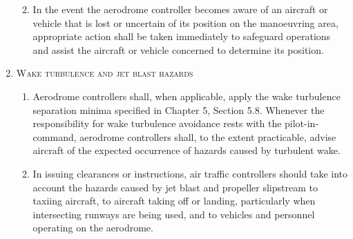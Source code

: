 \documentclass[../main.tex]{subfiles}
\begin{document}
\begin{enumerate}[itemsep=0.2cm]
\begin{enumerate}

            \item In the event the aerodrome controller becomes aware of an aircraft or vehicle that is lost or uncertain of its position on the manoeuvring area, appropriate action shall be taken immediately to safeguard operations and assist the aircraft or vehicle concerned to determine its position.
        \end{enumerate}

        \item \textsc{Wake turbulence and jet blast hazards}
        \begin{enumerate}
            \item Aerodrome controllers shall, when applicable, apply the wake turbulence separation minima specified in Chapter 5, Section 5.8. Whenever the responsibility for wake turbulence avoidance rests with the pilot-in-command, aerodrome controllers shall, to the extent practicable, advise aircraft of the expected occurrence of hazards caused by turbulent wake.


            \item In issuing clearances or instructions, air traffic controllers should take into account the hazards caused by jet blast and propeller slipstream to taxiing aircraft, to aircraft taking off or landing, particularly when intersecting runways are being used, and to vehicles and personnel operating on the aerodrome.


\end{enumerate}
\end{enumerate}
\end{document}
